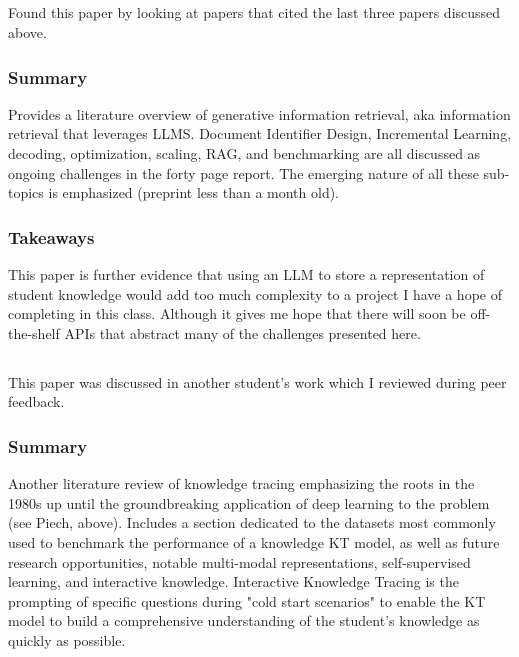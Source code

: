 \documentclass[
	letterpaper, %
]{jdf}
\begin{document}
\subsection{}
Found this paper by looking at papers that cited the last three papers discussed above.

\subsubsection{Summary}
Provides a literature overview of generative information retrieval, aka information retrieval that leverages LLMS. Document Identifier Design, Incremental Learning, decoding, optimization, scaling, RAG, and benchmarking are all discussed as ongoing challenges in the forty page report. The emerging nature of all these sub-topics is emphasized (preprint less than a month old).

\subsubsection{Takeaways}
This paper is further evidence that using an LLM to store a representation of student knowledge would add too much complexity to a project I have a hope of completing in this class. Although it gives me hope that there will soon be off-the-shelf APIs that abstract many of the challenges presented here.

\subsection{}
This paper was discussed in another student's work which I reviewed during peer feedback.

\subsubsection{Summary}
Another literature review of knowledge tracing emphasizing the roots in the 1980s up until the groundbreaking application of deep learning to the problem (see Piech, above). Includes a section dedicated to the datasets most commonly used to benchmark the performance of a knowledge KT model, as well as future research opportunities, notable multi-modal representations, self-supervised learning, and interactive knowledge. Interactive Knowledge Tracing is the prompting of specific questions during "cold start scenarios" to enable the KT model to build a comprehensive understanding of the student's knowledge as quickly as possible.
\end{document}
